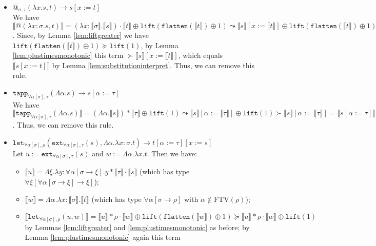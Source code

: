 \documentclass[runningheads,a4paper]{llncs}
\newcommand{\quant}[2]{\forall #1[#2]}
\newcommand{\qquant}[3]{#1 #2[#3]}
\newcommand{\typeinterpret}[1]{\llbracket #1 \rrbracket}
\newcommand{\interpret}[1]{\llbracket #1 \rrbracket}
\newcommand{\red}{\longrightarrow}
\newcommand{\arrtype}{\rightarrow}
\newcommand{\abs}[2]{\lambda #1.#2}
\newcommand{\tabs}[2]{\Lambda #1.#2}
\newcommand{\FTV}{\mathrm{FTV}}
\newcommand{\flatten}{\mathtt{flatten}}
\newcommand{\lift}{\mathtt{lift}}
\begin{document}
\begin{itemize}
\item $@_{\sigma,\tau}(\abs{x}{s},t) \red s[x:=t]$ \\ We have
  $\interpret{@(\abs{x:\sigma}{s},t)} = (\abs{x:\typeinterpret{
    \sigma}}{\interpret{s}}) \cdot \interpret{t} \oplus
  \lift(\flatten( \interpret{t}) \oplus 1) \leadsto
  \interpret{s}[x:=\interpret{t}] \oplus \lift(\flatten(\interpret{t})
  \oplus 1)$.  Since, by Lemma \ref{lem:liftgreater} we have
  $\lift(\flatten(\interpret{t}) \oplus 1) \succeq \lift(1)$, by Lemma
  \ref{lem:plustimesmonotonic} this term $\succ
  \interpret{s}[x:=\interpret{t}]$, which equals $\interpret{s[x:=t]}$
  by Lemma \ref{lem:substitutioninterpret}.  Thus, we can remove this
  rule.
\item $\mathtt{tapp}_{\quant{\alpha}{\sigma},\tau}(\tabs{\alpha}{s})
  \red s[\alpha:=\tau]$ \\ We have
  $\interpret{\mathtt{tapp}_{\quant{\alpha}{\sigma},
      \tau}(\tabs{\alpha}{s})} = (\tabs{\alpha}{\interpret{s}}) *
  \typeinterpret{\tau} \oplus \lift(1) \leadsto \interpret{s}[\alpha:=
    \typeinterpret{\tau}] \oplus \lift(1) \succ
  \interpret{s}[\alpha:=\typeinterpret{\tau}] =
  \interpret{s[\alpha:=\tau]}$.  Thus, we can remove this rule.
\item $\mathtt{let}_{\qquant{\forall}{\alpha}{\sigma},\rho}(
  \mathtt{ext}_{\qquant{\forall}{\alpha}{\sigma},\tau}(s),\tabs{\alpha}{
    \abs{x:\sigma}{t}}) \red t[\alpha:=\tau][x:=s]$ \\
  Let $u := \mathtt{ext}_{\quant{\alpha}{\sigma},\tau}(s)$ and
  $w := \tabs{\alpha}{\abs{x}{t}}$.  Then we have:
  \begin{itemize}
  \item $\interpret{u} =
    \tabs{\xi}{\abs{y:\quant{\alpha}{\sigma \arrtype \xi}}{
    y * \typeinterpret{\tau} \cdot \interpret{s}}}$ (which has type
    $\quant{\xi}{\quant{\alpha}{\sigma \arrtype \xi} \arrtype \xi}$);
  \item $\interpret{w} = \tabs{\alpha}{\abs{x:\typeinterpret{\sigma}}{
    \interpret{t}}}$ (which has type $\quant{\alpha}{\sigma \arrtype
    \rho}$ with $\alpha \notin \FTV(\rho)$);
  \item $\interpret{\mathtt{let}_{\quant{\alpha}{\sigma},\rho}(u,w)} =
    \interpret{u} * \rho \cdot \interpret{w} \oplus
    \lift(\flatten(\interpret{w})\oplus 1) \succeq
    \interpret{u} * \rho \cdot \interpret{w} \oplus \lift(1)$ by
    Lemmas \ref{lem:liftgreater} and \ref{lem:plustimesmonotonic} as
    before; by Lemma \ref{lem:plustimesmonotonic} again this term

\end{itemize}
\end{itemize}
\end{document}
